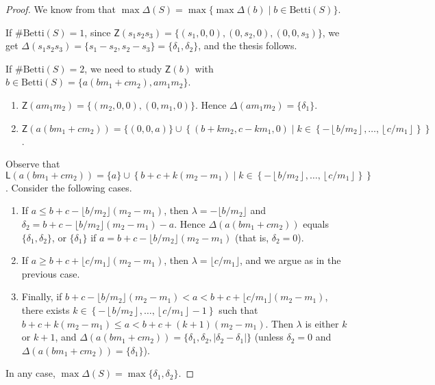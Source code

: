 \documentclass[11pt]{amsart}
\theoremstyle{remark}
\begin{document}
\begin{proof}
We know from \cite{CGLMS} that $\max\Delta(S)=\max\{\max\Delta(b) \mid b\in \mathrm{Betti}(S)\}$. 

If $\#\mathrm{Betti}(S)=1$, since $\mathsf Z(s_1s_2s_3)=\{(s_1,0,0),(0,s_2,0),(0,0,s_3)\}$, we get $\Delta(s_1s_2s_3)=\{s_1-s_2,s_2-s_3\}=\{\delta_1,\delta_2\}$, and the thesis follows. 

If $\#\mathrm{Betti}(S)=2$, we need to study $\mathsf Z(b)$ with $b\in \mathrm{Betti}(S)=\{a(bm_1+cm_2), am_1m_2\}$. 
\begin{enumerate}[$\bullet$]
	\item $\mathsf Z(am_1m_2)=\{(m_2,0,0),(0,m_1,0)\}$. Hence $\Delta(am_1m_2)=\{\delta_1\}$.
	
	\item $\mathsf Z(a(bm_1+cm_2))=\{ (0,0,a)\} \cup \left\{(b+k m_2,c-k m_1,0)\mid k \in \left\{-\left\lfloor{b}/{m_2}\right\rfloor,\ldots,\left\lfloor{c}/{m_1}\right\rfloor\right\}\right\}$.
\end{enumerate}  
Observe that $\mathsf L(a(bm_1+cm_2))=\{a\}\cup \left\{ b+c+k(m_2-m_1)\mid k \in \left\{-\left\lfloor{b}/{m_2}\right\rfloor,\ldots,\left\lfloor{c}/{m_1}\right\rfloor\right\}\right\}$. Consider the following cases.
\begin{enumerate}[(1)]
	\item If $a\le b+c-\lfloor b/m_2\rfloor (m_2-m_1)$, then $\lambda=-\lfloor b/m_2\rfloor$ and $\delta_2=b+c-\lfloor b/m_2\rfloor (m_2-m_1)-a$. Hence $\Delta(a(bm_1+cm_2))$ equals $\{\delta_1,\delta_2\}$, or $\{\delta_1\}$ if $a=b+c-\lfloor b/m_2\rfloor (m_2-m_1)$ (that is, $\delta_2=0$).
	
	\item If $a\ge b+c+\lfloor c/m_1\rfloor (m_2-m_1)$, then $\lambda=\lfloor c/m_1\rfloor$, and we argue as in the previous case.
	
	\item Finally, if $b+c-\lfloor b/m_2\rfloor (m_2-m_1) < a < b+c+\lfloor c/m_1\rfloor (m_2-m_1)$, there exists $k\in \left\{-\left\lfloor{b}/{m_2}\right\rfloor,\ldots,\left\lfloor{c}/{m_1}\right\rfloor -1\right\}$ such that $b+c+k(m_2-m_1) \le a <b+c+(k+1)(m_2-m_1)$. Then $\lambda$ is either $k$ or $k+1$, and $\Delta(a(bm_1+cm_2))=\{\delta_1,\delta_2,|\delta_2-\delta_1|\}$ (unless $\delta_2=0$ and $\Delta(a(bm_1+cm_2))=\{\delta_1\}$). 
\end{enumerate}
In any case, $\max\Delta(S)=\max\{\delta_1,\delta_2\}$.
\end{proof}
\end{document}
